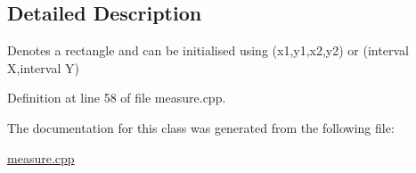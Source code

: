 \subsection{Detailed Description}
Denotes a rectangle and can be initialised using (x1,y1,x2,y2) or (interval X,interval Y) 

Definition at line 58 of file measure.\+cpp.



The documentation for this class was generated from the following file\+:\begin{DoxyCompactItemize}
\item 
\hyperlink{measure_8cpp}{measure.\+cpp}\end{DoxyCompactItemize}
